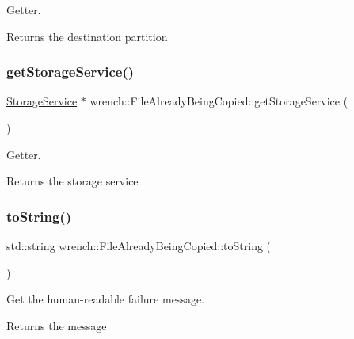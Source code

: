 Getter. 

\begin{DoxyReturn}{Returns}
the destination partition 
\end{DoxyReturn}
\mbox{\label{classwrench_1_1_file_already_being_copied_afac6f9f7f7dae1f51487c5a6223cad30}} 
\subsubsection{\texorpdfstring{get\+Storage\+Service()}{getStorageService()}}
{\footnotesize\ttfamily \hyperlink{classwrench_1_1_storage_service}{Storage\+Service} $\ast$ wrench\+::\+File\+Already\+Being\+Copied\+::get\+Storage\+Service (\begin{DoxyParamCaption}{ }\end{DoxyParamCaption})}



Getter. 

\begin{DoxyReturn}{Returns}
the storage service 
\end{DoxyReturn}
\mbox{\label{classwrench_1_1_file_already_being_copied_a44fa6078be3bd9e0b06cd536b691666c}} 
\subsubsection{\texorpdfstring{to\+String()}{toString()}}
{\footnotesize\ttfamily std\+::string wrench\+::\+File\+Already\+Being\+Copied\+::to\+String (\begin{DoxyParamCaption}{ }\end{DoxyParamCaption})\hspace{0.3cm}{\ttfamily [virtual]}}



Get the human-\/readable failure message. 

\begin{DoxyReturn}{Returns}
the message 
\end{DoxyReturn}


